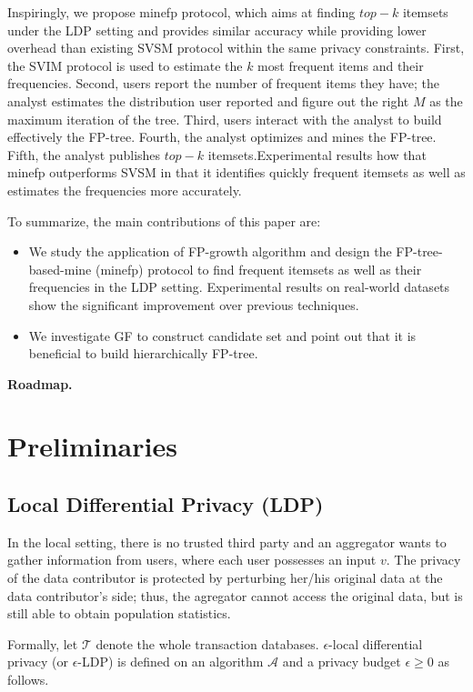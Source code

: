 \documentclass[conference]{IEEEtran}
\begin{document}
Inspiringly, we propose {\color{red}minefp} protocol, which aims at finding $top-k$ itemsets under the LDP setting and provides similar accuracy while providing lower overhead than existing SVSM protocol within the same privacy constraints.
First, the SVIM protocol is used to estimate the $k$ most frequent items and their frequencies. Second, users report the number of frequent items they have; the analyst estimates the distribution user reported and figure out the right $M$ as the maximum iteration of the tree. Third, users interact with the analyst to build effectively the FP-tree\cite{fp}. Fourth, the analyst optimizes and mines the FP-tree. Fifth, the analyst publishes $top-k$ itemsets.Experimental results how that {\color{red}minefp
outperforms SVSM in that it identifies quickly frequent itemsets as well as estimates the frequencies more accurately.}

{\color{red}
To summarize, the main contributions of this paper are:
\begin{itemize}
\item We study the application of FP-growth algorithm and design the FP-tree-based-mine (minefp) protocol to find frequent itemsets as well as their frequencies in the LDP setting. Experimental results on real-world datasets show the significant improvement over previous techniques.
\item We investigate GF to construct candidate set and point out that it is beneficial to build hierarchically FP-tree. 
\end{itemize}
}


\textbf{Roadmap.}

\section{Preliminaries}
\subsection{Local Differential Privacy (LDP)}
In the local setting, there is no trusted third party and an aggregator wants to gather information from users, where each user possesses an input $v$. The privacy of the data contributor is protected by perturbing her/his original data at the data contributor’s side; thus, the agregator cannot access the original data, but is still able to obtain population statistics.

Formally, let $\mathcal{T}$ denote the whole  transaction databases. $\epsilon$-local differential privacy (or $\epsilon$-LDP) is defined on an algorithm $\mathcal{A}$ and a privacy budget $\epsilon \geq 0$ as follows.
\end{document}
